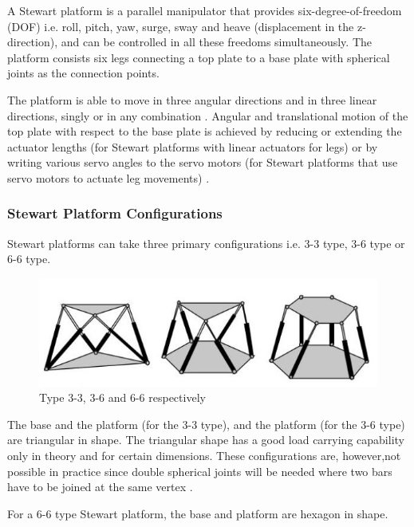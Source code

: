 A Stewart platform is a parallel manipulator that provides six-degree-of-freedom (DOF) i.e. roll, pitch, yaw, surge, sway and heave (displacement in the z-direction), and can be controlled in all these freedoms simultaneously. 
The platform consists six legs connecting a top plate to a base plate with spherical joints as the connection points.

The platform is able to move in three angular directions and in three linear directions, singly or in any combination \cite{stewart1965platform}. Angular and translational motion of the top plate with
respect to the base plate is achieved by reducing or extending the actuator lengths (for Stewart platforms with linear actuators for legs) or by writing various servo angles to the servo motors
 (for Stewart platforms that use servo motors to actuate leg movements) \cite{iqbal_dynamic_2008}.

 \subsubsection{Stewart Platform Configurations}
Stewart platforms can take three primary configurations i.e. 3-3 type, 3-6 type or 6-6 type.
\begin{center}
	\begin{figure}[H]
	\centering
	\includegraphics{Figures/stewart}
	\caption[Configurations]{Type 3-3, 3-6 and 6-6 respectively
	\cite{fernandes_design_nodate}}
	\end{figure}
\end{center}
The base and the platform (for the 3-3 type), and the platform (for the 3-6 type) are triangular in shape. The triangular shape has a good load carrying capability only in theory and for certain dimensions. These configurations are, however,not possible in practice since double spherical joints will be needed where two bars have to be joined at the same vertex
\cite{fernandes_design_nodate}.

For a 6-6 type Stewart platform, the base and platform are hexagon in shape.

